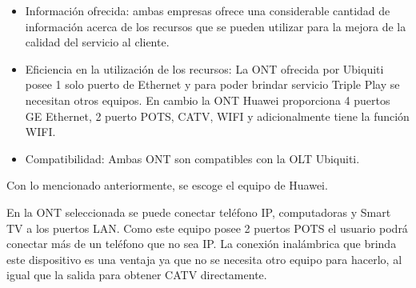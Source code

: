 \begin{enumerate}
\begin{enumerate}
\begin{itemize}
\item Información ofrecida: ambas empresas ofrece una considerable cantidad de información acerca de los recursos que se pueden utilizar para la mejora de la calidad del servicio al cliente.
\item Eficiencia en la utilización de los recursos: La ONT ofrecida por Ubiquiti posee 1 solo puerto de Ethernet y para poder brindar servicio Triple Play se necesitan otros equipos. En cambio la ONT Huawei proporciona 4 puertos GE Ethernet, 2 puerto POTS, CATV, WIFI y adicionalmente tiene la función WIFI. 
\item Compatibilidad: Ambas ONT son compatibles con la OLT Ubiquiti.
\end{itemize}
Con lo mencionado anteriormente, se escoge el equipo de Huawei.

En la ONT seleccionada se puede conectar teléfono IP, computadoras y Smart TV a los puertos LAN. Como este equipo posee 2 puertos POTS el usuario podrá conectar más de un teléfono que no sea IP. La conexión inalámbrica que brinda este dispositivo es una ventaja ya que no se necesita otro equipo para hacerlo, al igual que la salida para obtener CATV directamente. 




\end{enumerate}



\newpage






\end{enumerate}